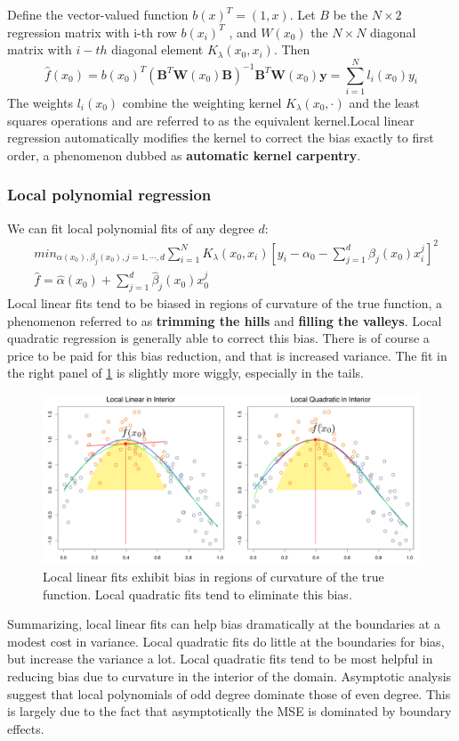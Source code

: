 \documentclass[12pt, letterpaper]{article}
\theoremstyle{definition}
\newcommand{\y}{\mathbf{y}}
\begin{document}
Define the vector-valued function $b(x)^T = (1, x)$. Let $B$ be the $N \times 2$ regression matrix with i-th row $b(x_i)^T$ , and $W(x_0)$ the $N \times N$ diagonal matrix with $i-th$ diagonal element $K_\lambda(x_0,x_i)$. Then
\begin{equation}
\hat{f}(x_0)= b(x_0)^T(\mathbf{B}^T\mathbf{W}(x_0)\mathbf{B})^{-1} \mathbf{B}^T\mathbf{W}(x_0)\y= \sum_{i=1}^N l_i(x_0)y_i
\end{equation}
The weights $l_i(x_0)$ combine the weighting kernel $K_\lambda(x_0, \cdot)$ and the least squares operations and are referred to as the equivalent kernel.Local linear regression automatically modifies the kernel to correct the bias exactly to
first order, a phenomenon dubbed as \textbf{automatic kernel carpentry}.

\subsubsection{Local polynomial regression}
We can fit local polynomial fits of any degree $d$:
\begin{equation}
\begin{aligned}
&min_{\alpha(x_0),\beta_j(x_0),j=1,\cdots,d} \sum_{i=1}^N K_\lambda(x_0,x_i)\left[ y_i - \alpha_0 -\sum_{j=1}^d\beta_j(x_0)x_i^j\right]^2\\
&\hat{f} = \hat{\alpha}(x_0) + \sum_{j=1}^d \hat{\beta}_j(x_0)x_0^j
\end{aligned}
\end{equation}
Local linear fits tend to be biased in regions of curvature of the true function, a phenomenon referred to as \textbf{trimming the hills} and \textbf{filling the valleys}. Local quadratic regression is generally able to correct this bias. There is of course a price to be paid for this bias reduction, and that is increased variance. The fit in the right panel of \ref{localLinQuad} is slightly more
wiggly, especially in the tails.
\begin{figure}
\centering
\includegraphics[scale=0.4]{img/localLinQuad}
\caption{Local linear fits exhibit bias in regions of curvature of the true function. Local quadratic fits tend to eliminate this bias.}
\label{localLinQuad}
\end{figure}
Summarizing, local linear fits can help bias dramatically at the boundaries at a modest cost in variance. Local quadratic fits do little at the boundaries for bias, but increase the variance a lot. Local quadratic fits tend to be most helpful in reducing bias due to curvature in the interior of the domain. Asymptotic analysis suggest that local polynomials of odd degree dominate those of even degree. This is largely due to the fact that asymptotically the MSE is dominated by boundary effects.
\end{document}
